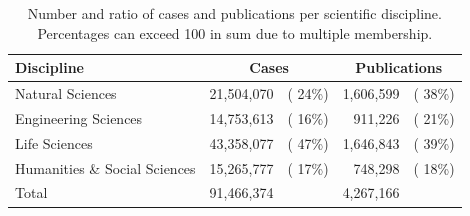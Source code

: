 \documentclass[fleqn,10pt]{wlscirep}
\begin{document}
\begin{table}[ht]
\caption{Number and ratio of cases and publications per scientific discipline. Percentages can exceed 100 in sum due to multiple membership.}
\label{tab:disciplines}
\centering
\begin{tabular}{lrrrr}
\toprule
  \textsf{\textbf{Discipline}}  & \multicolumn{2}{c}{\textsf{\textbf{Cases}}} & \multicolumn{2}{c}{\textsf{\textbf{Publications}}} \\
\midrule
  Natural Sciences              & 21,504,070 &          ({\color{gray} 24\%}) & 1,606,599 &                  ({\color{gray} 38\%}) \\
  Engineering Sciences          & 14,753,613 &          ({\color{gray} 16\%}) &   911,226 &                  ({\color{gray} 21\%}) \\
  Life Sciences                 & 43,358,077 &          ({\color{gray} 47\%}) & 1,646,843 &                  ({\color{gray} 39\%}) \\
  Humanities \& Social Sciences & 15,265,777 &          ({\color{gray} 17\%}) &   748,298 &                  ({\color{gray} 18\%}) \\
  Total                         & 91,466,374 &                                & 4,267,166 &                                        \\
\bottomrule
\end{tabular}
\end{table}
\end{document}
